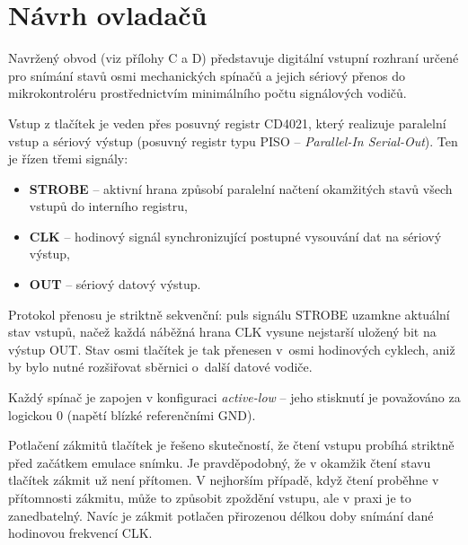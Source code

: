 \chapter{Návrh ovladačů}

Navržený obvod (viz přílohy C a D) představuje digitální vstupní rozhraní určené pro snímání stavů
osmi mechanických spínačů a jejich sériový přenos do mikrokontroléru prostřednictvím minimálního
počtu signálových vodičů.

Vstup z tlačítek je veden přes posuvný registr CD4021, který realizuje paralelní vstup a sériový
výstup (posuvný registr typu PISO -- \textit{Parallel-In Serial-Out}). Ten je řízen třemi signály:

\begin{itemize}
    \item \textbf{STROBE} -- aktivní hrana způsobí paralelní načtení okamžitých stavů všech vstupů do
        interního registru,
    \item \textbf{CLK} -- hodinový signál synchronizující postupné vysouvání dat na sériový výstup,
    \item \textbf{OUT} -- sériový datový výstup.
\end{itemize}

Protokol přenosu je striktně sekvenční: puls signálu STROBE uzamkne aktuální stav vstupů, načež
každá náběžná hrana CLK vysune nejstarší uložený bit na výstup OUT. Stav osmi tlačítek je tak
přenesen v~osmi hodinových cyklech, aniž by bylo nutné rozšiřovat sběrnici o~další datové vodiče.

Každý spínač je zapojen v konfiguraci \textit{active-low} -- jeho stisknutí je považováno za
logickou 0 (napětí blízké referenčními GND).

Potlačení zákmitů tlačítek je řešeno skutečností, že čtení vstupu probíhá striktně před začátkem
emulace snímku. Je pravděpodobný, že v okamžik čtení stavu tlačítek zákmit už není přítomen. V
nejhorším případě, když čtení proběhne v přítomnosti zákmitu, může to způsobit zpoždění vstupu, ale
v praxi je to zanedbatelný. Navíc je zákmit potlačen přirozenou délkou doby snímání dané hodinovou
frekvencí CLK.

